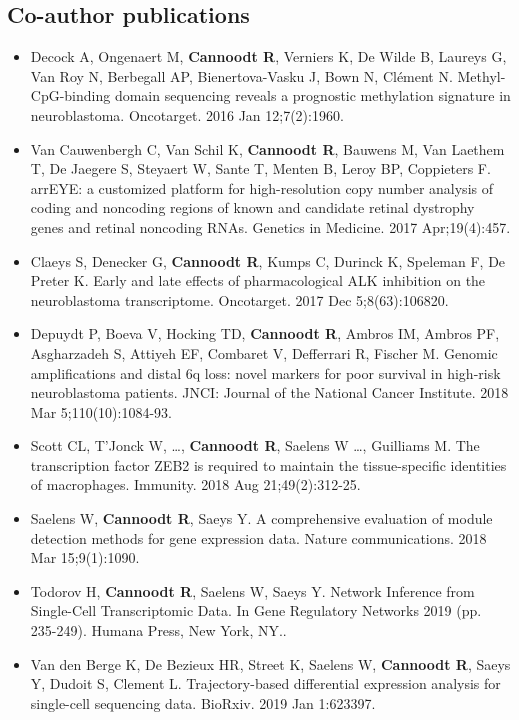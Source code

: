 \subsection{Co-author publications}
\begin{itemize}
	\item Decock A, Ongenaert M, \textbf{Cannoodt R}, Verniers K, De Wilde B, Laureys G, Van Roy N, Berbegall AP, Bienertova-Vasku J, Bown N, Clément N. Methyl-CpG-binding domain sequencing reveals a prognostic methylation signature in neuroblastoma. Oncotarget. 2016 Jan 12;7(2):1960.
	\item Van Cauwenbergh C, Van Schil K, \textbf{Cannoodt R}, Bauwens M, Van Laethem T, De Jaegere S, Steyaert W, Sante T, Menten B, Leroy BP, Coppieters F. arrEYE: a customized platform for high-resolution copy number analysis of coding and noncoding regions of known and candidate retinal dystrophy genes and retinal noncoding RNAs. Genetics in Medicine. 2017 Apr;19(4):457.
	\item Claeys S, Denecker G, \textbf{Cannoodt R}, Kumps C, Durinck K, Speleman F, De Preter K. Early and late effects of pharmacological ALK inhibition on the neuroblastoma transcriptome. Oncotarget. 2017 Dec 5;8(63):106820.
	\item Depuydt P, Boeva V, Hocking TD, \textbf{Cannoodt R}, Ambros IM, Ambros PF, Asgharzadeh S, Attiyeh EF, Combaret V, Defferrari R, Fischer M. Genomic amplifications and distal 6q loss: novel markers for poor survival in high-risk neuroblastoma patients. JNCI: Journal of the National Cancer Institute. 2018 Mar 5;110(10):1084-93.
	\item Scott CL, T'Jonck W, \ldots, \textbf{Cannoodt R}, Saelens W \ldots, Guilliams M. The transcription factor ZEB2 is required to maintain the tissue-specific identities of macrophages. Immunity. 2018 Aug 21;49(2):312-25.
	\item Saelens W, \textbf{Cannoodt R}, Saeys Y. A comprehensive evaluation of module detection methods for gene expression data. Nature communications. 2018 Mar 15;9(1):1090.
	\item Todorov H, \textbf{Cannoodt R}, Saelens W, Saeys Y. Network Inference from Single-Cell Transcriptomic Data. In Gene Regulatory Networks 2019 (pp. 235-249). Humana Press, New York, NY..
	\item Van den Berge K, De Bezieux HR, Street K, Saelens W, \textbf{Cannoodt R}, Saeys Y, Dudoit S, Clement L. Trajectory-based differential expression analysis for single-cell sequencing data. BioRxiv. 2019 Jan 1:623397.

\end{itemize}
